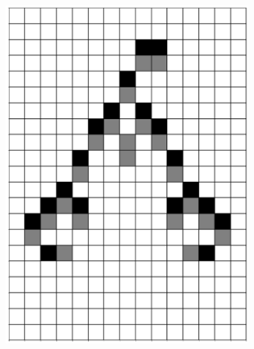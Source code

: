 \documentclass[12pt]{article}
\numberwithin{figure}{section} %
\begin{document}
\begin{figure}[H]
\begin{subfigure}{0.19\textwidth}
     \includegraphics[width=\linewidth]{Section4/26.3}
     \subcaption{}
   \end{subfigure}
           \begin{subfigure}{0.19\textwidth}
     \centering

\end{subfigure}
\end{figure}
\end{document}
